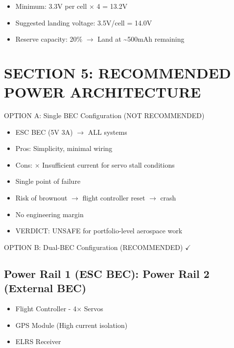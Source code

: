\documentclass[11pt,letterpaper]{article}
\begin{document}
\begin{itemize}
  \item Minimum: 3.3V per cell $\times$ 4 = 13.2V
  \item Suggested landing voltage: 3.5V/cell = 14.0V
  \item Reserve capacity: 20\% $\rightarrow$ Land at \textasciitilde{}500mAh remaining
\end{itemize}

\section{SECTION 5: RECOMMENDED POWER ARCHITECTURE}

OPTION A: Single BEC Configuration (NOT RECOMMENDED)\par

\begin{itemize}
  \item ESC BEC (5V 3A) $\rightarrow$ ALL systems
\end{itemize}

\begin{itemize}
  \item Pros:  Simplicity, minimal wiring
  \item Cons:  $\times$ Insufficient current for servo stall conditions
  \item Single point of failure
  \item Risk of brownout $\rightarrow$ flight controller reset $\rightarrow$ crash
  \item No engineering margin
\end{itemize}

\begin{itemize}
  \item VERDICT: UNSAFE for portfolio-level aerospace work
\end{itemize}

OPTION B: Dual-BEC Configuration (RECOMMENDED) $\checkmark$\par

\subsection{Power Rail 1 (ESC BEC):        Power Rail 2 (External BEC)}

\begin{itemize}
  \item Flight Controller            - 4$\times$ Servos
  \item GPS Module                   (High current isolation)
  \item ELRS Receiver
\end{itemize}
\end{document}

